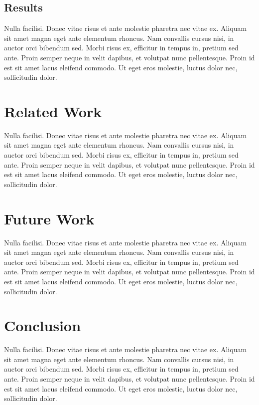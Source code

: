 \documentclass[sigconf,nonacm,11pt]{acmart}
\begin{document}
\subsection{Results}

Nulla facilisi. Donec vitae risus et ante molestie pharetra nec vitae ex. Aliquam sit amet magna eget ante elementum rhoncus. Nam convallis cursus nisi, in auctor orci bibendum sed. Morbi risus ex, efficitur in tempus in, pretium sed ante. Proin semper neque in velit dapibus, et volutpat nunc pellentesque. Proin id est sit amet lacus eleifend commodo. Ut eget eros molestie, luctus dolor nec, sollicitudin dolor.

\section{Related Work}

Nulla facilisi. Donec vitae risus et ante molestie pharetra nec vitae ex. Aliquam sit amet magna eget ante elementum rhoncus. Nam convallis cursus nisi, in auctor orci bibendum sed. Morbi risus ex, efficitur in tempus in, pretium sed ante. Proin semper neque in velit dapibus, et volutpat nunc pellentesque. Proin id est sit amet lacus eleifend commodo. Ut eget eros molestie, luctus dolor nec, sollicitudin dolor.

\section{Future Work}

Nulla facilisi. Donec vitae risus et ante molestie pharetra nec vitae ex. Aliquam sit amet magna eget ante elementum rhoncus. Nam convallis cursus nisi, in auctor orci bibendum sed. Morbi risus ex, efficitur in tempus in, pretium sed ante. Proin semper neque in velit dapibus, et volutpat nunc pellentesque. Proin id est sit amet lacus eleifend commodo. Ut eget eros molestie, luctus dolor nec, sollicitudin dolor.

\section{Conclusion}

Nulla facilisi. Donec vitae risus et ante molestie pharetra nec vitae ex. Aliquam sit amet magna eget ante elementum rhoncus. Nam convallis cursus nisi, in auctor orci bibendum sed. Morbi risus ex, efficitur in tempus in, pretium sed ante. Proin semper neque in velit dapibus, et volutpat nunc pellentesque. Proin id est sit amet lacus eleifend commodo. Ut eget eros molestie, luctus dolor nec, sollicitudin dolor.



\end{document}

